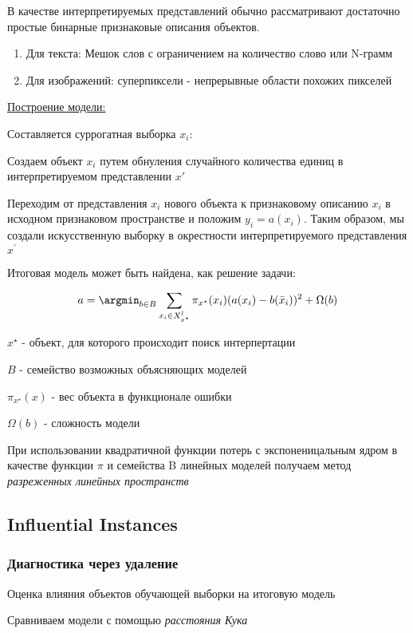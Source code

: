 \documentclass[a4paper, 12pt]{article}
\begin{document}
В качестве интерпретируемых представлений обычно
рассматривают достаточно простые бинарные признаковые описания объектов.

\begin{enumerate}
    \item Для текста: Мешок слов с ограничением на количество слово или N-грамм
    \item Для изображений: суперпиксели - непрерывные области похожих пикселей
\end{enumerate}

\underline{Построение модели:}

Составляется суррогатная выборка $x_i$:

Создаем объект $x_i$ путем обнуления случайного 
количества единиц в интерпретируемом представлении $x'$

Переходим от представления $x_i$ нового объекта 
к признаковому описанию $x_i$ в исходном признаковом пространстве 
и положим $y_i = a(x_i)$. Таким образом,
мы создали искусственную выборку в окрестности 
интерпретируемого представления $x^{\prime}$

Итоговая модель может быть найдена, как решение задачи:

\[a = \argmin_{b \in B} \sum_{x_i \in X_{x^{\star}}^l} 
\pi_{x^{\star}}(x_i)(a(x_i) - b(\bar{x}_i))^2 + \Omega(b)\]

$x^{\star}$ - объект, для которого происходит поиск интерпертации

$B$ - семейство возможных объясняющих моделей

$\pi_{x^{\star}}(x)$ - вес объекта в функционале ошибки


$\Omega(b)$ - сложность модели

При использовании квадратичной функции потерь с 
экспоненицальным ядром в качестве функции $\pi$ и семейства
B линейных моделей получаем метод 
\textit{разреженных линейных пространств}

\subsection{Influential Instances}

\subsubsection{Диагностика через удаление}

Оценка влияния объектов обучающей выборки на итоговую модель

Сравниваем модели с помощью \textit{расстояния Кука}
\end{document}
